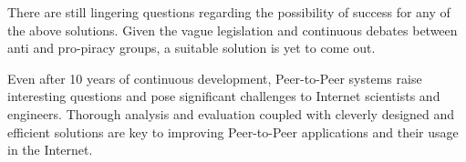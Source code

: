 There are still lingering questions regarding the possibility of success for
any of the above solutions. Given the vague legislation and continuous debates
between anti and pro-piracy groups, a suitable solution is yet to come out.

Even after 10 years of continuous development, Peer-to-Peer systems raise
interesting questions and pose significant challenges to Internet scientists
and engineers. Thorough analysis and evaluation coupled with cleverly
designed and efficient solutions are key to improving Peer-to-Peer
applications and their usage in the Internet.
